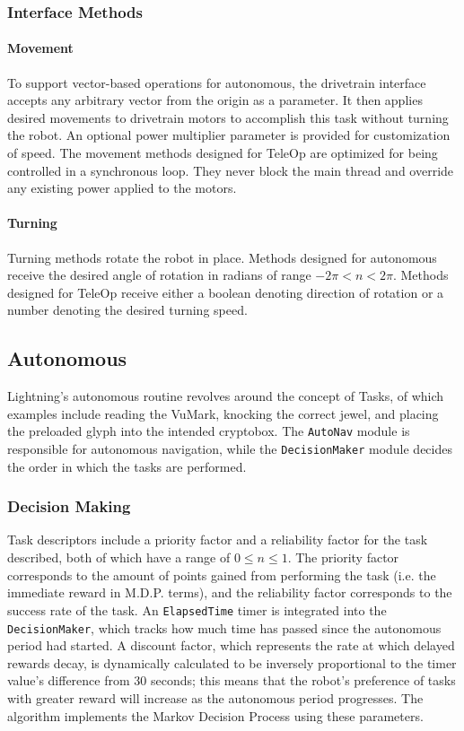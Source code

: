 \documentclass[letterpaper]{article}
\begin{document}
\subsubsection{Interface Methods}

\paragraph{Movement}
To support vector-based operations for autonomous, the drivetrain interface accepts any arbitrary vector from the origin as a parameter. It then applies desired movements to drivetrain motors to accomplish this task without turning the robot. An optional power multiplier parameter is provided for customization of speed. The movement methods designed for TeleOp are optimized for being controlled in a synchronous loop. They never block the main thread and override any existing power applied to the motors.

\paragraph{Turning}
Turning methods rotate the robot in place. Methods designed for autonomous receive the desired angle of rotation in radians of range $-2\pi < n < 2\pi$. Methods designed for TeleOp receive either a boolean denoting direction of rotation or a number denoting the desired turning speed.

\subsection{Autonomous}
Lightning's autonomous routine revolves around the concept of Tasks, of which examples include reading the VuMark, knocking the correct jewel, and placing the preloaded glyph into the intended cryptobox. The \texttt{AutoNav} module is responsible for autonomous navigation, while the \texttt{DecisionMaker} module decides the order in which the tasks are performed.

\subsubsection{Decision Making}
Task descriptors include a priority factor and a reliability factor for the task described, both of which have a range of $0 \leq n \leq 1$. The priority factor corresponds to the amount of points gained from performing the task (i.e. the immediate reward in M.D.P. terms), and the reliability factor corresponds to the success rate of the task. An \texttt{ElapsedTime} timer is integrated into the \texttt{DecisionMaker}, which tracks how much time has passed since the autonomous period had started. A discount factor, which represents the rate at which delayed rewards decay, is dynamically calculated to be inversely proportional to the timer value's difference from 30 seconds; this means that the robot's preference of tasks with greater reward will increase as the autonomous period progresses. The algorithm implements the Markov Decision Process using these parameters.
\end{document}
